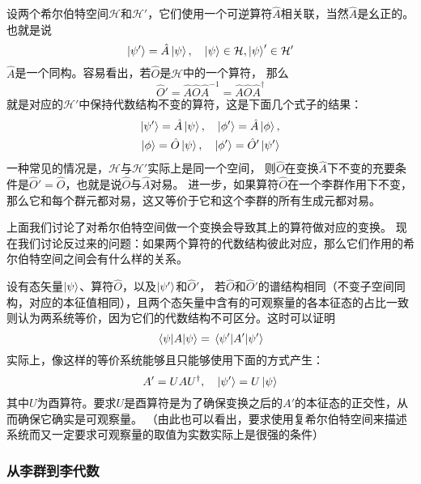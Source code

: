 \documentclass[UTF8, a4paper]{ctexart}
\begin{document}
设两个希尔伯特空间$\mathcal{H}$和$\mathcal{H}'$，它们使用一个可逆算符$\hat{A}$相关联，当然$\hat{A}$是幺正的。也就是说
\[
    \ket{\psi'} = \hat{A} \ket{\psi}, \quad \ket{\psi} \in \mathcal{H},  \ket{\psi}' \in \mathcal{H}'
\]
$\hat{A}$是一个同构。容易看出，若$\hat{O}$是$\mathcal{H}$中的一个算符，
那么
\begin{equation}
    \hat{O}' = \hat{A} \hat{O} \hat{A}^{-1} = \hat{A} \hat{O} \hat{A}^\dagger
\end{equation}
就是对应的$\mathcal{H}'$中保持代数结构不变的算符，这是下面几个式子的结果：
\[
    \begin{split}
        \ket{\psi'} = \hat{A} \ket{\psi}, \quad \ket{\phi'} = \hat{A} \ket{\phi}, \\
        \ket{\phi} = \hat{O} \ket{\psi}, \quad \ket{\phi'} = \hat{O}' \ket{\psi'}
    \end{split}
\]
一种常见的情况是，$\mathcal{H}$与$\mathcal{H}'$实际上是同一个空间，
则$\hat{O}$在变换$\hat{A}$下不变的充要条件是$\hat{O}'=\hat{O}$，也就是说$\hat{O}$与$\hat{A}$对易。
进一步，如果算符$\hat{O}$在一个李群作用下不变，那么它和每个群元都对易，这又等价于它和这个李群的所有生成元都对易。

上面我们讨论了对希尔伯特空间做一个变换会导致其上的算符做对应的变换。
现在我们讨论反过来的问题：如果两个算符的代数结构彼此对应，那么它们作用的希尔伯特空间之间会有什么样的关系。

设有态矢量$\ket{\psi}$、算符$\hat{O}$，以及$\ket{\psi'}$和$\hat{O}'$，
若$\hat{O}$和$\hat{O}'$的谱结构相同（不变子空间同构，对应的本征值相同），且两个态矢量中含有的可观察量的各本征态的占比一致
则认为两系统等价，因为它们的代数结构不可区分。这时可以证明
\begin{equation}
    \mel{\psi}{A}{\psi} = \mel{\psi'}{A'}{\psi'}
\end{equation}
实际上，像这样的等价系统能够且只能够使用下面的方式产生：
\begin{equation}
    A' = U A U^\dagger, \quad \ket{\psi'} = U \ket{\psi}
\end{equation}
其中$U$为酉算符。要求$U$是酉算符是为了确保变换之后的$A'$的本征态的正交性，从而确保它确实是可观察量。
（由此也可以看出，要求使用复希尔伯特空间来描述系统而又一定要求可观察量的取值为实数实际上是很强的条件）

\subsubsection{从李群到李代数}
\end{document}
